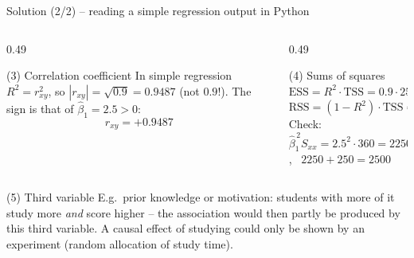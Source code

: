 \documentclass[aspectratio=169,11pt]{beamer}
\begin{document}
\begin{frame}{Solution (2/2) -- reading a simple regression output in Python}
  \begin{columns}[T]
    \begin{column}{0.49\textwidth}
      \begin{exampleblock}{(3) Correlation coefficient}
        In simple regression $R^2=r_{xy}^2$, so
        $|r_{xy}|=\sqrt{0.9}=0.9487$ (not $0.9$!). The sign is that of
        $\hat\beta_1=2.5>0$:
        \[
          r_{xy}=\mathbf{+0.9487}
        \]
        \vspace{-12pt}
      \end{exampleblock}
    \end{column}
    \begin{column}{0.49\textwidth}
      \begin{exampleblock}{(4) Sums of squares}
        $\text{ESS}=R^2\cdot\text{TSS}=0.9\cdot2500=\mathbf{2250}$\\
        $\text{RSS}=(1-R^2)\cdot\text{TSS}=0.1\cdot2500=\mathbf{250}$\\[2pt]
        Check: $\hat\beta_1^{\,2}S_{xx}=2.5^2\cdot360=2250$ \checkmark,
        \ $2250+250=2500$ \checkmark
      \end{exampleblock}
    \end{column}
  \end{columns}
  \begin{block}{(5) Third variable}
    E.g.\ prior knowledge or motivation: students with more of it study more
    \emph{and} score higher -- the association would then partly be produced by
    this third variable. A causal effect of studying could only be shown by an
    experiment (random allocation of study time).
  \end{block}
\end{frame}
\end{document}
